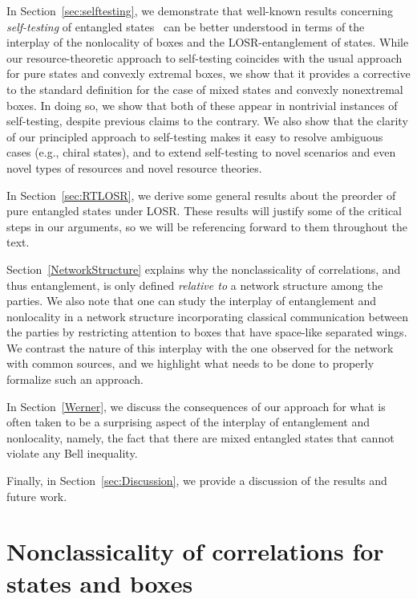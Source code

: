 \documentclass[12pt]{article}
\theoremstyle{plain}
\theoremstyle{definition}
\begin{document}
In Section~\ref{sec:selftesting}, we demonstrate that well-known results concerning {\em self-testing} of entangled states~\cite{mayers1998quantum,mayers2003self,vsupic2020self,Scarani2019}  can be better understood in terms of the interplay of the nonlocality of boxes and the LOSR-entanglement of states.
While our resource-theoretic approach to self-testing coincides with the usual approach for pure states and convexly extremal boxes, we show that it provides a corrective to the standard definition for the case of mixed states and convexly nonextremal boxes. In doing so, we show that both of these appear in nontrivial instances of self-testing, despite previous claims to the contrary. We also show that the clarity of our principled approach to self-testing makes it easy to resolve ambiguous cases (e.g., chiral states), and to extend self-testing to novel scenarios and even novel types of resources and novel resource theories.

In Section~\ref{sec:RTLOSR}, we derive some general results about the preorder of pure entangled states under LOSR. These results will justify some of the critical steps in our arguments, so we will be referencing forward to them throughout the text.


Section~\ref{NetworkStructure} 
explains
 why the nonclassicality of correlations, and thus entanglement, is only defined {\em relative to} a network structure among the parties. We also note that one can study the interplay of entanglement and nonlocality in a network structure incorporating classical communication between the parties by restricting attention to  boxes that have space-like separated wings.  We contrast the nature of this interplay with the one observed for the network with common sources, and we highlight what needs to be done to properly formalize such an approach.

In Section~\ref{Werner}, we discuss the consequences of our approach for what is often taken to be a surprising aspect of the interplay of entanglement and nonlocality, namely, the fact that there are mixed entangled states that cannot violate any Bell inequality. 

 Finally, in Section~\ref{sec:Discussion}, we provide a discussion of the results and future work.


\section{Nonclassicality of correlations for states and boxes}\label{sec:unifiedRT}
\end{document}
